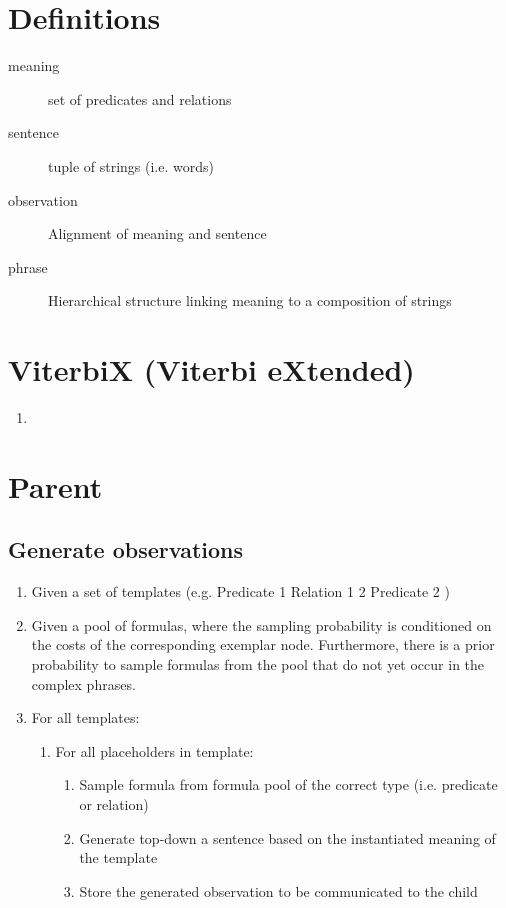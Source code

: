 \documentclass[a4paper]{article}
\begin{document}
\section{Definitions}
\begin{description}
  \item[meaning] set of predicates and relations
  \item[sentence] tuple of strings (i.e. words)
  \item[observation] Alignment of meaning and sentence
  \item[phrase] Hierarchical structure linking meaning to a composition of strings
\end{description}

\section{ViterbiX (Viterbi eXtended)}
\begin{enumerate}
  \item 
\end{enumerate}

\section{Parent}
\subsection{Generate observations}
\begin{enumerate}
  \item Given a set of templates (e.g. Predicate 1 Relation 1 2 Predicate 2 )
  \item Given a pool of formulas, where the sampling probability is conditioned on the costs of the corresponding exemplar node. Furthermore, there is a prior probability to sample formulas from the pool that do not yet occur in the complex phrases.
  \item For all templates:
    \begin{enumerate}
      \item For all placeholders in template:
        \begin{enumerate}
          \item Sample formula from formula pool of the correct type (i.e. predicate or relation)
          \item Generate top-down a sentence based on the instantiated meaning of the template
          \item Store the generated observation to be communicated to the child
        \end{enumerate}
    \end{enumerate}
\end{enumerate}
\end{document}
